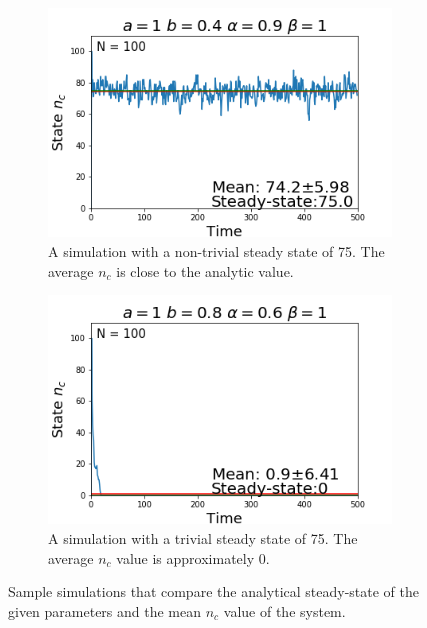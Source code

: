 \begin{figure}[h]
  \centering
  \begin{subfigure}[b]{0.4\linewidth}
    \includegraphics[width=\linewidth]{images/chapter3/ssA.png}
    \caption{A simulation with a non-trivial steady state of 75. The average $n_{c}$ is close to the analytic value.}
  \end{subfigure}
  \begin{subfigure}[b]{0.4\linewidth}
    \includegraphics[width=\linewidth]{images/chapter3/ssB.png}
    \caption{A simulation with a trivial steady state of 75. The average $n_{c}$ value is approximately $0$.}
  \end{subfigure}
  \caption{Sample simulations that compare the analytical steady-state of the given parameters and the mean $n_{c}$ value of the system.}
  \label{fig:compareSingleSS}
\end{figure}

